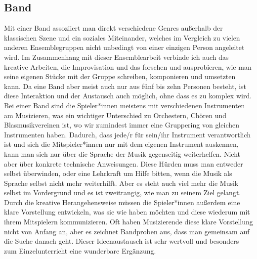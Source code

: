\subsection{Band}
Mit einer Band assoziiert man direkt verschiedene Genres außerhalb der
klassischen Szene und ein soziales Miteinander, welches im Vergleich zu vielen
anderen Ensemblegruppen nicht unbedingt von einer einzigen Person angeleitet
wird. Im Zusammenhang mit dieser Ensemblearbeit verbinde ich auch das kreative
Arbeiten, die Improvisation und das forschen und ausprobieren, wie man seine
eigenen Stücke mit der Gruppe schreiben, komponieren und umsetzten kann. Da eine
Band aber meist auch nur aus fünf bis zehn Personen besteht, ist diese
Interaktion und der Austausch auch möglich, ohne dass es zu komplex wird. Bei
einer Band sind die Spieler*innen meistens mit verschiedenen Instrumenten am
Musizieren, was ein wichtiger Unterschied zu Orchestern, Chören und
Blasmusikvereinen ist, wo wir zumindest immer eine Gruppering von gleichen
Instrumenten haben. Dadurch, dass jede/r für sein/ihr Instrument verantwortlich
ist und sich die Mitspieler*innen nur mit dem eigenen Instrument auskennen, kann
man sich nur über die Sprache der Musik gegenseitig weiterhelfen. Nicht aber
über konkrete technische Anweisungen. Diese Hürden muss man entweder selbst
überwinden, oder eine Lehrkraft um Hilfe bitten, wenn die Musik als Sprache
selbst nicht mehr weiterhilft. Aber es steht auch viel mehr die Musik selbst im
Vordergrund und es ist zweitrangig, wie man zu seinem Ziel gelangt. Durch die
kreative Herangehensweise müssen die Spieler*innen außerdem eine klare
Vorstellung entwickeln, was sie wie haben möchten und diese wiederum mit ihrem
Mitspielern kommunizieren. Oft haben Musizierende diese klare Vorstellung nicht
von Anfang an, aber es zeichnet Bandproben aus, dass man gemeinsam auf die Suche
danach geht. Dieser Ideenaustausch ist sehr wertvoll und besonders zum Einzelunterricht eine
wunderbare Ergänzung.



